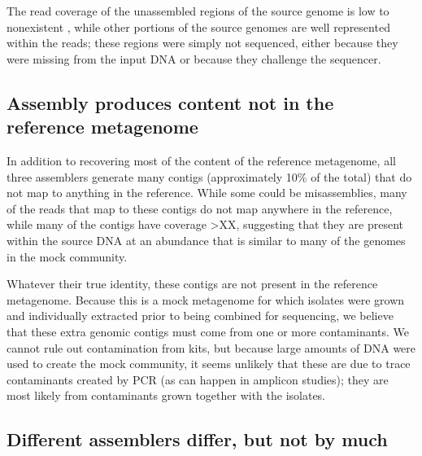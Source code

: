 \documentclass[10pt,a4paper,twocolumn]{article}
\begin{document}
The read coverage of the unassembled regions of the source genome is low to nonexistent , while other portions of the source genomes are well represented within the reads; these regions were simply not sequenced, either because they were missing from the input DNA or because they challenge the sequencer. %


\subsection*{Assembly produces content not in the reference metagenome}
In addition to recovering most of the content of the reference metagenome, all three assemblers generate many contigs (approximately 10\% of the total) that do not map to anything in the reference.  While some could be misassemblies, many of the reads that map to these contigs do not map anywhere in the reference, while many of the contigs have coverage >XX, suggesting that they are present within the source DNA at an abundance that is similar to many of the genomes in the mock community. 


Whatever their true identity, these contigs are not present in the reference metagenome. Because this is a mock metagenome for which isolates were grown and individually extracted prior to being combined for sequencing, we believe that these extra genomic contigs must come from one or more contaminants.  We cannot rule out contamination from kits, but because large amounts of DNA were used to create the mock community, it seems unlikely that these are due to trace contaminants created by PCR (as can happen in amplicon studies); they are most likely from contaminants grown together with the isolates.

\subsection*{Different assemblers differ, but not by much}
\end{document}
